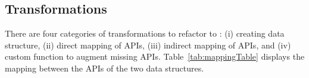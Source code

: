 \documentclass{sigplanconf}
\begin{document}





%
%
%
%
%
%
%


\subsection{Transformations}
\label{sec:transformations}

There are four categories of transformations to refactor \NC{} to : 
(i) creating \CDT{} data structure, (ii) direct mapping of APIs, (iii) indirect mapping of APIs, and (iv) custom function to augment missing APIs. Table~\ref{tab:mappingTable} displays the mapping between the APIs of the two data structures.
\end{document}
